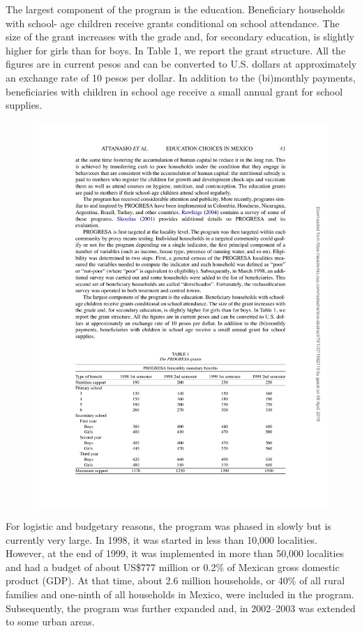 \documentclass{handoutForSolutions}
\begin{document}
The largest component of the program is the education. Beneficiary households with school- age children receive grants conditional on school attendance. The size of the grant increases with the grade and, for secondary education, is slightly higher for girls than for boys. In Table 1, we report the grant structure. All the figures are in current pesos and can be converted to U.S. dollars at approximately an exchange rate of 10 pesos per dollar. In addition to the (bi)monthly payments, beneficiaries with children in school age receive a small annual grant for school supplies.
\begin{figure}[H]
\centering
\includegraphics[width=1\linewidth]{image/AttanasioMeghir Santiago2011Figure1.pdf}
\end{figure}
For logistic and budgetary reasons, the program was phased in slowly but is currently very large. In 1998, it was started in less than 10,000 localities. However, at the end of 1999, it was implemented in more than 50,000 localities and had a budget of about US\$777 million or 0.2\% of Mexican gross domestic product (GDP). At that time, about 2.6 million households, or 40\% of all rural families and one-ninth of all households in Mexico, were included in the program. Subsequently, the program was further expanded and, in 2002–2003 was extended to some urban areas.
\end{document}
